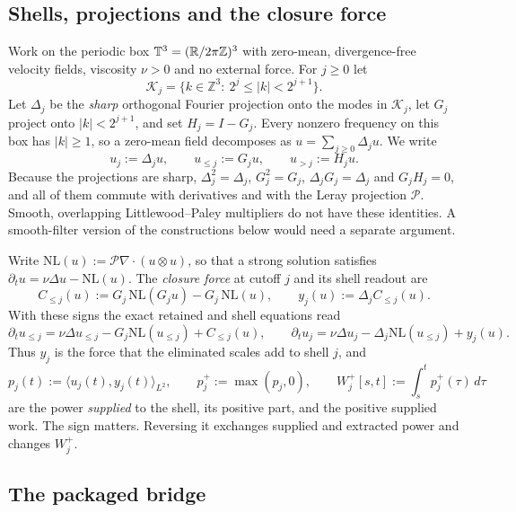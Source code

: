 \subsection{Shells, projections and the closure force}
\label{sec:ns_object_mapping}

Work on the periodic box $\mathbb{T}^3=(\mathbb{R}/2\pi\mathbb{Z})^3$ with zero-mean, divergence-free velocity
fields, viscosity $\nu>0$ and no external force. For $j\ge 0$ let
\[
\mathcal K_j=\{k\in\mathbb{Z}^3:\ 2^j\le |k|<2^{j+1}\}.
\]
Let $\Delta_j$ be the \emph{sharp} orthogonal Fourier projection onto the modes in $\mathcal K_j$, let $G_j$
project onto $|k|<2^{j+1}$, and set $H_j=I-G_j$. Every nonzero frequency on this box has $|k|\ge 1$,
so a zero-mean field decomposes as $u=\sum_{j\ge0}\Delta_j u$. We write
\[
u_j:=\Delta_j u,\qquad u_{\le j}:=G_j u,\qquad u_{>j}:=H_j u.
\]
Because the projections are sharp, $\Delta_j^2=\Delta_j$, $G_j^2=G_j$, $\Delta_jG_j=\Delta_j$ and
$G_jH_j=0$, and all of them commute with derivatives and with the Leray projection $\mathcal P$.
Smooth, overlapping Littlewood--Paley multipliers \citep{bahouri2011fourier} do not have these
identities. A smooth-filter version of the constructions below would need a separate argument.

Write $\mathrm{NL}(u):=\mathcal P\nabla\cdot(u\otimes u)$, so that a strong solution satisfies
$\partial_t u=\nu\Delta u-\mathrm{NL}(u)$. The \emph{closure force} at cutoff $j$ and its shell
readout are
\begin{equation}\label{eq:closure}
C_{\le j}(u):=G_j\,\mathrm{NL}(G_ju)-G_j\,\mathrm{NL}(u),\qquad y_j(u):=\Delta_j C_{\le j}(u).
\end{equation}
With these signs the exact retained and shell equations read
\[
\partial_t u_{\le j}=\nu\Delta u_{\le j}-G_j\mathrm{NL}(u_{\le j})+C_{\le j}(u),
\qquad
\partial_t u_j=\nu\Delta u_j-\Delta_j\mathrm{NL}(u_{\le j})+y_j(u).
\]
Thus $y_j$ is the force that the eliminated scales add to shell $j$, and
\begin{equation}\label{eq:power}
p_j(t):=\langle u_j(t),y_j(t)\rangle_{L^2},\qquad p_j^+:=\max(p_j,0),\qquad
W_j^+[s,t]:=\int_s^t p_j^+(\tau)\,d\tau
\end{equation}
are the power \emph{supplied} to the shell, its positive part, and the positive supplied work.
The sign matters. Reversing it exchanges supplied and extracted power and changes $W_j^+$.

\subsection{The packaged bridge}

